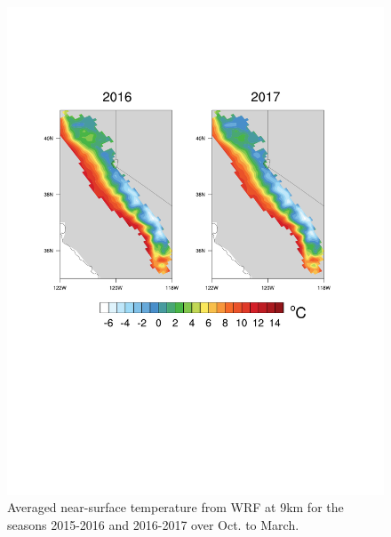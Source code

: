 \documentclass[grl]{agutexSI}
\begin{document}
\begin{figure}
\begin{center}
\includegraphics[width=6in]{FigS4.pdf}
\caption{Averaged near-surface temperature from WRF at 9km for the seasons 2015-2016 and 2016-2017 over Oct. to March.}
\end{center}
\end{figure}
\end{document}
